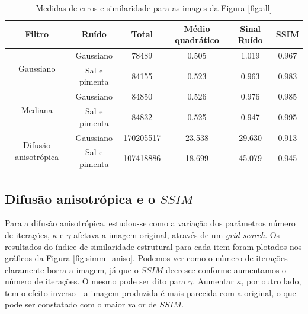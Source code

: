 \documentclass[10pt,a4paper]{article}
\begin{document}
\begin{table}[!ht]
\begin{tabular}{cccccc}
\toprule
Filtro & Ruído & Total & Médio quadrático & Sinal Ruído & SSIM \\ \midrule
\multirow{2}{*}{Gaussiano}              & Gaussiano         & 78489 & 0.505 & 1.019 & 0.967 \\
                                        & Sal e pimenta     & 84155 & 0.523 & 0.963 & 0.983 \\\midrule
\multirow{2}{*}{Mediana}                & Gaussiano         & 84850 & 0.526 & 0.976 & 0.985 \\
                                        & Sal e pimenta    & 84832 & 0.525 & 0.947 & 0.995 \\\midrule
\multirow{2}{*}{Difusão anisotrópica}   & Gaussiano     & 170205517 & 23.538 & 29.630 & 0.913 \\
                                        & Sal e pimenta & 107418886 & 18.699 & 45.079 & 0.945 \\\bottomrule
\end{tabular}
\caption{Medidas de erros e similaridade para as images da Figura \ref{fig:all}}
\label{tab:results}
\end{table}

\subsection{Difusão anisotrópica e o $\mathit{SSIM}$}
Para a difusão anisotrópica, estudou-se como a variação dos parâmetros número de iterações, $\kappa$ e $\gamma$ afetava a imagem original, através de um \textit{grid search}. Os resultados do índice de similaridade estrutural para cada item foram plotados nos gráficos da Figura \ref{fig:simm_aniso}. Podemos ver como o número de iterações claramente borra a imagem, já que o $\mathit{SSIM}$ decresce conforme aumentamos o número de iterações. O mesmo pode ser dito para $\gamma$. Aumentar $\kappa$, por outro lado, tem o efeito inverso - a imagem produzida é mais parecida com a original, o que pode ser constatado com o maior valor de $\mathit{SSIM}$.
\end{document}
